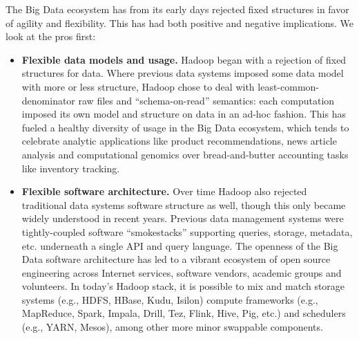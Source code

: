 \documentclass[10pt,letterpaper]{article}
\begin{document}
The Big Data ecosystem has from its early days rejected fixed structures in favor of agility and flexibility.  This has had both positive and negative implications.  We look at the pros first:
\begin{itemize}
\item \textbf{Flexible data models and usage.} Hadoop began with a rejection of fixed structures for data.  Where previous data systems imposed some data model with more or less structure, Hadoop chose to deal with least-common-denominator raw files and ``schema-on-read'' semantics: each computation imposed its own model and structure on data in an ad-hoc fashion.  This has fueled a healthy diversity of usage in the Big Data ecosystem, which tends to celebrate analytic applications like product recommendations, news article analysis and computational genomics over bread-and-butter accounting tasks like inventory tracking.
\item \textbf{Flexible software architecture.} Over time Hadoop also rejected traditional data systems software structure as well, though this only became widely understood in recent years.  Previous data management systems were tightly-coupled software ``smokestacks'' supporting queries, storage, metadata, etc. underneath a single API and query language.  The openness of the Big Data software architecture has led to a vibrant ecosystem of open source engineering across Internet services, software vendors, academic groups and volunteers.  In today's Hadoop stack, it is possible to mix and match storage systems (e.g., HDFS, HBase, Kudu, Isilon) compute frameworks (e.g., MapReduce, Spark, Impala, Drill, Tez, Flink, Hive, Pig, etc.) and schedulers (e.g., YARN, Mesos), among other more minor swappable components. 
\end{itemize}
\end{document}
